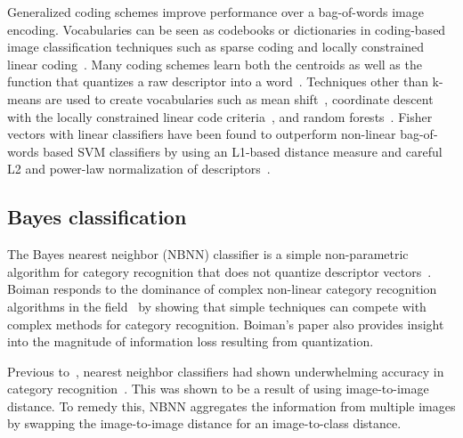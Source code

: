         Generalized coding schemes improve performance over a bag-of-words image encoding. Vocabularies can be seen
        as codebooks or dictionaries in coding-based image classification techniques such as sparse coding and
        locally constrained linear coding~\cite{jurie_creating_2005, yang_linear_2009, yang_supervised_2010,
        yang_efficient_2010, wang_locality_constrained_2010}. Many coding schemes learn both the centroids as well
        as the function that quantizes a raw descriptor into a word~\cite{jurie_creating_2005, yang_linear_2009,
        yang_supervised_2010, yang_efficient_2010, wang_locality_constrained_2010, vedaldi_multiple_2009}.
        Techniques other than k-means are used to create vocabularies such as mean
        shift~\cite{jurie_creating_2005}, coordinate descent with the locally constrained linear code
        criteria~\cite{wang_locality_constrained_2010}, and random forests~\cite{perronnin_fisher_2007}. Fisher
        vectors with linear classifiers have been found to outperform non-linear bag-of-words based SVM classifiers
        by using an L1-based distance measure and careful L2 and power-law normalization of
        descriptors~\cite{perronnin_improving_2010, perronnin_large_scale_2010}.

    \subsection{\Naive{} Bayes classification}\label{sec:nbnn}  

        The \naive{} Bayes nearest neighbor (NBNN) classifier is a simple non-parametric algorithm for category
        recognition that does not quantize descriptor vectors~\cite{boiman_defense_2008}. Boiman responds to the
        dominance of complex non-linear category recognition algorithms in the field~\cite{varma_learning_2007,
        marszalek_learning_2007} by showing that simple techniques can compete with complex methods for category
        recognition. Boiman's paper also provides insight into the magnitude of information loss resulting from
        quantization.
          
        Previous to~\cite{boiman_defense_2008}, nearest neighbor classifiers had shown underwhelming accuracy in
        category recognition~\cite{varma_unifying_2004, lazebnik_beyond_2006, marszalek_learning_2007}. This was
        shown to be a result of using image-to-image distance. To remedy this, NBNN aggregates the information from
        multiple images by swapping the image-to-image distance for an image-to-class distance.

